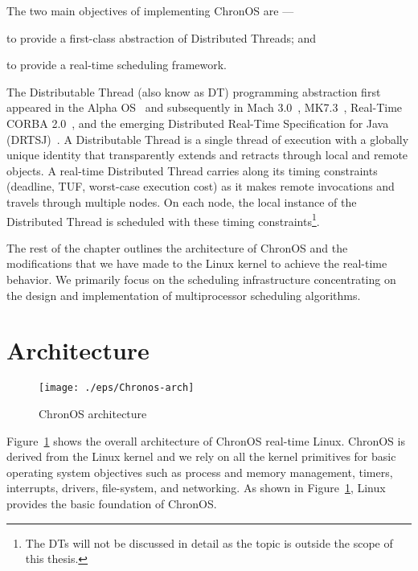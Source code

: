 \documentclass[12pt,dvips]{report}
\begin{document}
The two main objectives of implementing ChronOS are ---
\begin{inparaenum}[(i)]
\item to provide a first-class abstraction of Distributed Threads; and
\item to provide a real-time scheduling framework.
\end{inparaenum}
The Distributable Thread (also know as DT) programming abstraction first appeared in the Alpha OS~\cite{alpha} and subsequently in Mach 3.0~\cite{mach30}, MK7.3~\cite{mk98}, Real-Time CORBA 2.0~\cite{omg0901}, and the emerging Distributed Real-Time Specification for Java (DRTSJ)~\cite{jw02}. A Distributable Thread is a single thread of execution with a globally unique identity that transparently extends and retracts through local and remote objects. A real-time Distributed Thread carries along its timing constraints (deadline, TUF, worst-case execution cost) as it makes remote invocations and travels through multiple nodes. On each node, the local instance of the Distributed Thread is scheduled with these timing constraints\footnote{The DTs will not be discussed in detail as the topic is outside the scope of this thesis.}. 

The rest of the chapter outlines the architecture of ChronOS and the modifications that we have made to the Linux kernel to achieve the real-time behavior. We primarily focus on the scheduling infrastructure concentrating on the design and implementation of multiprocessor scheduling algorithms.

\section{Architecture}\label{sec:chronos-architecture}

\begin{figure} [!t]
  \centering
  \texttt{[image: ./eps/Chronos-arch]}
  \caption{ChronOS architecture}
  \label{fig:chronos-arch}
\end{figure}

Figure~\ref{fig:chronos-arch} shows the overall architecture of ChronOS real-time Linux. ChronOS is derived from the Linux kernel and we rely on all the kernel primitives for basic operating system objectives such as process and memory management, timers, interrupts, drivers, file-system, and networking. As shown in Figure~\ref{fig:chronos-arch}, Linux provides the basic foundation of ChronOS. 
\end{document}
